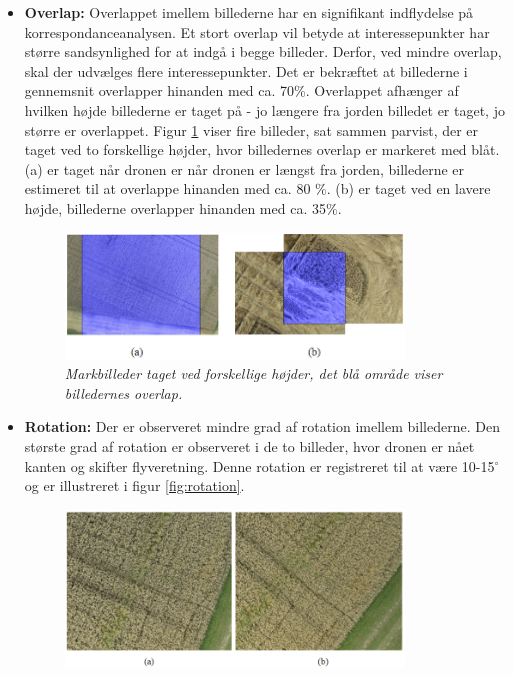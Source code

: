 \begin{itemize}
\item{\textbf{Overlap:} Overlappet imellem billederne har en signifikant indflydelse på korrespondanceanalysen. Et stort overlap vil betyde at interessepunkter har større sandsynlighed for at indgå i begge billeder. Derfor, ved mindre overlap, skal der udvælges flere interessepunkter. Det er bekræftet at billederne i gennemsnit overlapper hinanden med ca. 70\%. Overlappet afhænger af hvilken højde billederne er taget på - jo længere fra jorden billedet er taget, jo større er overlappet. Figur \ref{fig:overlap} viser fire billeder, sat sammen parvist, der er taget ved to forskellige højder, hvor billedernes overlap er markeret med blåt. (a) er taget når dronen er når dronen er længst fra jorden, billederne er estimeret til at overlappe hinanden med ca. 80 $\%$. (b) er taget ved en lavere højde, billederne overlapper hinanden med ca. 35$\%$.
\begin{figure}[H]
    \centering
    \includegraphics[width=0.85\textwidth]{fig/17.png}
     \vspace{-1em}
    \begin{center}    
       \caption{{\footnotesize \textit{Markbilleder taget ved forskellige højder, det blå område viser billedernes overlap.}}}
    \label{fig:overlap}
     \end{center}
     \vspace{-2.5em}
  \end{figure} \noindent }
\item{\textbf{Rotation:} Der er observeret mindre grad af rotation imellem billederne.
Den største grad af rotation er observeret i de to billeder, hvor dronen er nået kanten og skifter flyveretning. Denne rotation er registreret til at være 10-15$^{\circ}$ og er illustreret i figur \ref{fig:rotation}.
\begin{figure}[H]
    \centering
    \includegraphics[width=0.85\textwidth]{fig/19.png}

\end{figure}}
\end{itemize}
